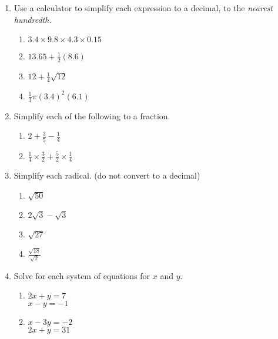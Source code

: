 \begin{enumerate}[itemsep=0.75cm]
  \item Use a calculator to simplify each expression to a decimal, to the \emph{nearest hundredth}.
  \begin{multicols}{2}
  \begin{enumerate}[itemsep=1.5cm]
    \item $3.4 \times 9.8 \times 4.3 \times 0.15$ 
    \item $13.65 + \frac{1}{2} (8.6)$  
    \item $12 + \frac{1}{4} \sqrt{12}$
    \item $\frac{1}{3} \pi (3.4)^2(6.1)$
  \end{enumerate}
  \end{multicols}\vspace{0.5cm}

  \item Simplify each of the following to a fraction.
  \begin{multicols}{2}
  \begin{enumerate}[itemsep=4cm]
    \item $\displaystyle 2+\frac{3}{5}-\frac{1}{4}$ 
    \item $\displaystyle \frac{1}{4} \times \frac{3}{2} + \frac{5}{2} \times \frac{1}{4}$
  \end{enumerate}
  \end{multicols}\vspace{3cm}

\item Simplify each radical. (do not convert to a decimal)
  \begin{multicols}{2}
    \begin{enumerate}[itemsep=2cm]
      \item $\sqrt{50}$ 
      \item $2\sqrt{3} - \sqrt{3}$
      \item $\sqrt{27}$ 
      \item $\displaystyle \frac{\sqrt{18}}{\sqrt{2}}$ 
    \end{enumerate}
    \end{multicols}\vspace{2cm}
  
\newpage
\item Solve for each system of equations for $x$ and $y$.
\begin{multicols}{2}
  \begin{enumerate}
    \item $2x+y=7$ \\
    $x -y =-1$
    \item $x-3y=-2$ \\
    $2x+y =31$
  \end{enumerate}
\end{multicols} \vspace{7cm}


\end{enumerate}
